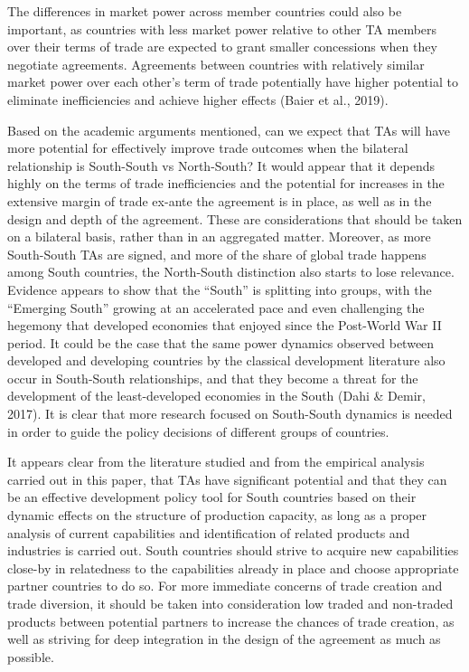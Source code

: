 The differences in market power across member countries could also be
important, as countries with less market power relative to other TA
members over their terms of trade are expected to grant smaller
concessions when they negotiate agreements. Agreements between countries
with relatively similar market power over each other's term of trade
potentially have higher potential to eliminate inefficiencies and
achieve higher effects (Baier et al., 2019).

Based on the academic arguments mentioned, can we expect that TAs will
have more potential for effectively improve trade outcomes when the
bilateral relationship is South-South vs North-South? It would appear
that it depends highly on the terms of trade inefficiencies and the
potential for increases in the extensive margin of trade ex-ante the
agreement is in place, as well as in the design and depth of the
agreement. These are considerations that should be taken on a bilateral
basis, rather than in an aggregated matter. Moreover, as more
South-South TAs are signed, and more of the share of global trade
happens among South countries, the North-South distinction also starts
to lose relevance. Evidence appears to show that the ``South'' is
splitting into groups, with the ``Emerging South'' growing at an
accelerated pace and even challenging the hegemony that developed
economies that enjoyed since the Post-World War II period. It could be
the case that the same power dynamics observed between developed and
developing countries by the classical development literature also occur
in South-South relationships, and that they become a threat for the
development of the least-developed economies in the South (Dahi \&
Demir, 2017). It is clear that more research focused on South-South
dynamics is needed in order to guide the policy decisions of different
groups of countries.

It appears clear from the literature studied and from the empirical
analysis carried out in this paper, that TAs have significant potential
and that they can be an effective development policy tool for South
countries based on their dynamic effects on the structure of production
capacity, as long as a proper analysis of current capabilities and
identification of related products and industries is carried out. South
countries should strive to acquire new capabilities close-by in
relatedness to the capabilities already in place and choose appropriate
partner countries to do so. For more immediate concerns of trade
creation and trade diversion, it should be taken into consideration low
traded and non-traded products between potential partners to increase
the chances of trade creation, as well as striving for deep integration
in the design of the agreement as much as possible.
